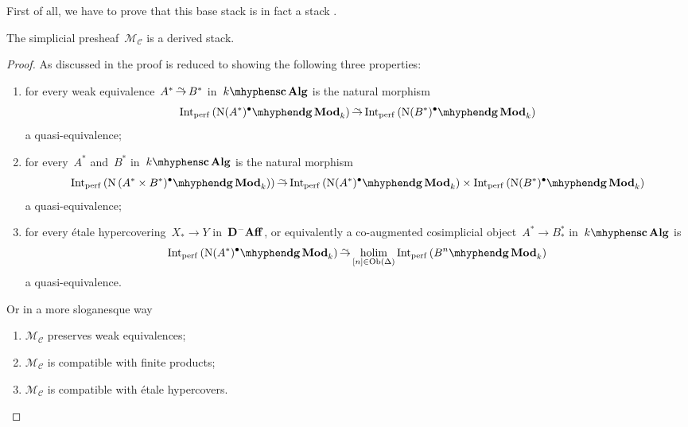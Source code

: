 \begin{refsection}
First of all, we have to prove that this base stack is in fact a stack \cite[lemma 3.1]{toen-vaquie}.

\begin{theorem}
  \label{theorem:derived-moduli-stack-is-stack}
  The simplicial presheaf~$\mathcal{M}_{\mathcal{C}}$ is a derived stack.

  \begin{proof}[Proof]
    As discussed in \cite[\S 2.1.1]{hagII} the proof is reduced to showing the following three properties:
    \begin{enumerate}
      \item for every weak equivalence~$A^*\weq B^*$ in~$\scAlg{k}$ is the natural morphism
        \begin{equation}
          \label{equation:condition-1}
          \Int_\perf\left( \dgMod{\nerve(A^*)^\bullet}_k \right)\weq\Int_\perf\left( \dgMod{\nerve(B^*)^\bullet}_k \right)
        \end{equation}
        a quasi-equivalence;
      \item for every~$A^*$ and~$B^*$ in~$\scAlg{k}$ is the natural morphism
        \begin{equation}
          \Int_\perf\left( \dgMod{\nerve\left( A^*\times B^*)^\bullet}_k \right) \right)\weq\Int_\perf\left( \dgMod{\nerve(A^*)^\bullet}_k \right)\times\Int_\perf\left( \dgMod{\nerve(B^*)^\bullet}_k \right)
        \end{equation}
        a quasi-equivalence;
      \item for every \'etale hypercovering~$X_*\to Y$ in~$\mathbf{D}^-\mathbf{Aff}$, or equivalently a co-augmented cosimplicial object~$A^*\to B_*^*$ in~$\scAlg{k}$ is
        \begin{equation}
          \label{equation:condition-3}
          \Int_\perf\left( \dgMod{\nerve(A^*)^\bullet}_k \right)\weq\holim_{[n]\in\Ob(\Delta)}\Int_\perf\left( \dgMod{B^n}_k \right)
        \end{equation}
        a quasi-equivalence.
    \end{enumerate}
    Or in a more sloganesque way
    \begin{enumerate}
      \item $\mathcal{M}_{\mathcal{C}}$ preserves weak equivalences;
      \item $\mathcal{M}_{\mathcal{C}}$ is compatible with finite products;
      \item $\mathcal{M}_{\mathcal{C}}$ is compatible with \'etale hypercovers.
    \end{enumerate}


\end{proof}
\end{theorem}
\end{refsection}
